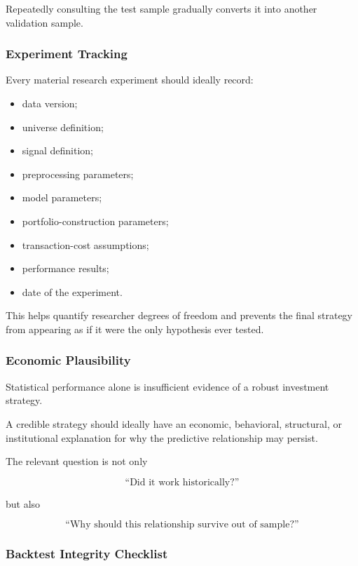 \documentclass[11pt,a4paper]{article}
\begin{document}
Repeatedly consulting the test sample gradually converts it into another
validation sample.


\subsubsection{Experiment Tracking}

Every material research experiment should ideally record:

\begin{itemize}
    \item data version;
    \item universe definition;
    \item signal definition;
    \item preprocessing parameters;
    \item model parameters;
    \item portfolio-construction parameters;
    \item transaction-cost assumptions;
    \item performance results;
    \item date of the experiment.
\end{itemize}

This helps quantify researcher degrees of freedom and prevents the final
strategy from appearing as if it were the only hypothesis ever tested.


\subsubsection{Economic Plausibility}

Statistical performance alone is insufficient evidence of a robust investment
strategy.

A credible strategy should ideally have an economic, behavioral, structural,
or institutional explanation for why the predictive relationship may persist.

The relevant question is not only

\begin{equation}
\text{``Did it work historically?''}
\end{equation}

but also

\begin{equation}
\boxed{
\text{``Why should this relationship survive out of sample?''}
}
\end{equation}


\subsubsection{Backtest Integrity Checklist}
\end{document}
